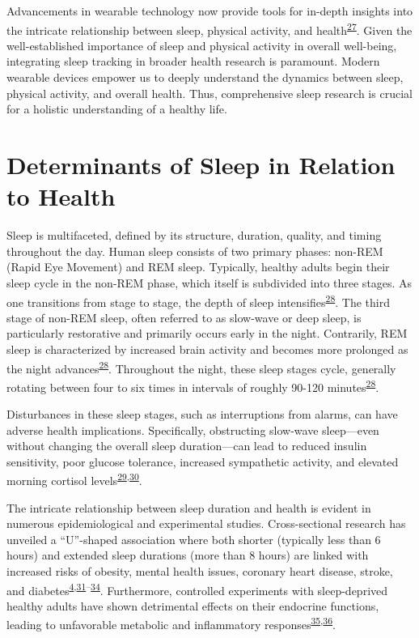 \documentclass[
  10pt,
]{scrbook}
\begin{document}
Advancements in wearable technology now provide tools for in-depth
insights into the intricate relationship between sleep, physical
activity, and
health\textsuperscript{\protect\hyperlink{ref-rollo_whole_2020}{27}}.
Given the well-established importance of sleep and physical activity in
overall well-being, integrating sleep tracking in broader health
research is paramount. Modern wearable devices empower us to deeply
understand the dynamics between sleep, physical activity, and overall
health. Thus, comprehensive sleep research is crucial for a holistic
understanding of a healthy life.

\hypertarget{determinants-of-sleep-in-relation-to-health}{%
\section{Determinants of Sleep in Relation to
Health}\label{determinants-of-sleep-in-relation-to-health}}

Sleep is multifaceted, defined by its structure, duration, quality, and
timing throughout the day. Human sleep consists of two primary phases:
non-REM (Rapid Eye Movement) and REM sleep. Typically, healthy adults
begin their sleep cycle in the non-REM phase, which itself is subdivided
into three stages. As one transitions from stage to stage, the depth of
sleep
intensifies\textsuperscript{\protect\hyperlink{ref-roebuck_2014}{28}}.
The third stage of non-REM sleep, often referred to as slow-wave or deep
sleep, is particularly restorative and primarily occurs early in the
night. Contrarily, REM sleep is characterized by increased brain
activity and becomes more prolonged as the night
advances\textsuperscript{\protect\hyperlink{ref-roebuck_2014}{28}}.
Throughout the night, these sleep stages cycle, generally rotating
between four to six times in intervals of roughly 90-120
minutes\textsuperscript{\protect\hyperlink{ref-roebuck_2014}{28}}.

Disturbances in these sleep stages, such as interruptions from alarms,
can have adverse health implications. Specifically, obstructing
slow-wave sleep---even without changing the overall sleep duration---can
lead to reduced insulin sensitivity, poor glucose tolerance, increased
sympathetic activity, and elevated morning cortisol
levels\textsuperscript{\protect\hyperlink{ref-stamatakis_2010}{29},\protect\hyperlink{ref-herzog_2013}{30}}.

The intricate relationship between sleep duration and health is evident
in numerous epidemiological and experimental studies. Cross-sectional
research has unveiled a ``U''-shaped association where both shorter
(typically less than 6 hours) and extended sleep durations (more than 8
hours) are linked with increased risks of obesity, mental health issues,
coronary heart disease, stroke, and
diabetes\textsuperscript{\protect\hyperlink{ref-cappuccio_sleep_2010}{4},\protect\hyperlink{ref-reutrakul_2018}{31}--\protect\hyperlink{ref-cappuccio_2008}{34}}.
Furthermore, controlled experiments with sleep-deprived healthy adults
have shown detrimental effects on their endocrine functions, leading to
unfavorable metabolic and inflammatory
responses\textsuperscript{\protect\hyperlink{ref-banks_2007}{35},\protect\hyperlink{ref-vancauter_2008}{36}}.
\end{document}
